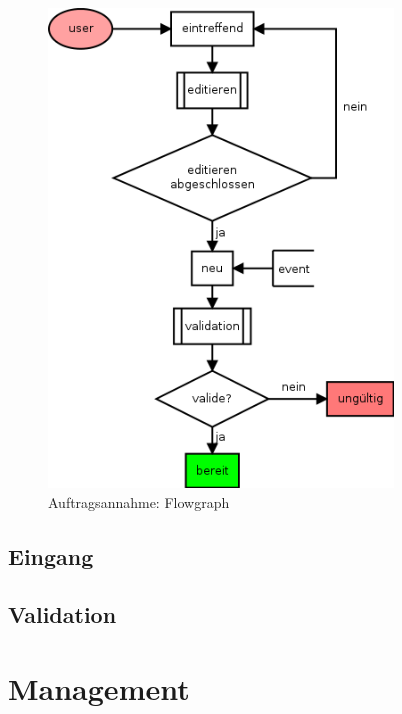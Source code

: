 \begin{figure}[ht] 
  \label{fig:lebenszyklus-auftrag-eingang}
  \begin{center}
      \includegraphics[height=5in]{imageinput/lebenszyklus-auftrag-eingang.png}
  \end{center}
  \caption{Auftragsannahme: Flowgraph}
\end{figure}


\subsection{Eingang}
\subsection{Validation}

\section{Management}



